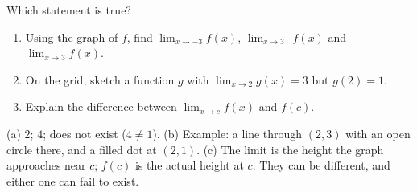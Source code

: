 \begin{exo}{}
Which statement is true?
\end{exo}
\begin{exo}{}
\begin{enumerate}[label=(\alph*)]
\item Using the graph of $f$, find $\lim_{x\to-3}f(x)$, $\lim_{x\to3^-}f(x)$ and $\lim_{x\to3}f(x)$.
\item On the grid, sketch a function $g$ with $\lim_{x\to2}g(x)=3$ but $g(2)=1$.
\item Explain the difference between $\lim_{x\to c}f(x)$ and $f(c)$.
\end{enumerate}
\work{4cm}
\begin{solution}
(a) $2$; $4$; does not exist ($4\neq1$). \;(b) Example: a line through $(2,3)$ with an open circle there, and a filled dot at $(2,1)$. \;(c) The limit is the height the graph approaches near $c$; $f(c)$ is the actual height at $c$. They can be different, and either one can fail to exist.
\end{solution}
\end{exo}

